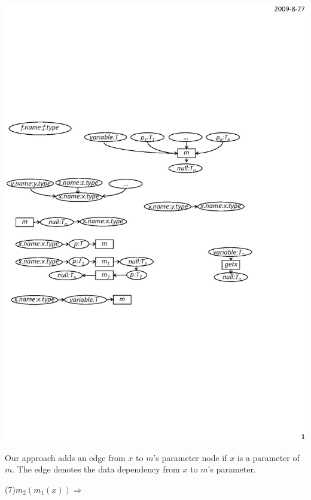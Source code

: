 \begin{center}
\includegraphics[scale=0.7,clip]{figure/rule6.eps}%
\end{center}

Our approach adds an edge from $x$ to $m$'s parameter node if $x$ is
a parameter of $m$. The edge denotes the data dependency from $x$ to
$m$'s parameter.

(7)$m_2(m_1(x))\Rightarrow$

